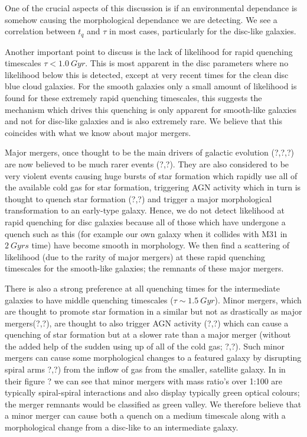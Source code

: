 \documentclass{mn2e}
\begin{document}
One of the crucial aspects of this discussion is if an environmental dependance is somehow causing the morphological dependance we are detecting. We see a correlation between $t_q$ and $\tau$ in most cases, particularly for the disc-like galaxies. 

Another important point to discuss is the lack of likelihood for rapid quenching timescales $\tau < 1.0~Gyr$. This is most apparent in the disc parameters where no likelihood below this is detected, except at very recent times for the clean disc blue cloud galaxies. For the smooth galaxies only a small amount of likelihood is found for these extremely rapid quenching timescales, this suggests the mechanism which drives this quenching is only apparent for smooth-like galaxies and not for disc-like galaxies and is also extremely rare. We believe that this coincides with what we know about major mergers. 

Major mergers, once thought to be the main drivers of galactic evolution (?,?,?) are now believed to be much rarer events (?,?). They are also considered to be very violent events causing huge bursts of star formation which rapidly use all of the available cold gas for star formation, triggering AGN activity which in turn is thought to quench star formation (?,?) and trigger a major morphological transformation to an early-type galaxy. Hence, we do not detect likelihood at rapid quenching for disc galaxies because all of those which have undergone a quench such as this (for example our own galaxy when it collides with M31 in $2~Gyrs$ time) have become smooth in morphology. We then find a scattering of likelihood (due to the rarity of major mergers) at these rapid quenching timescales for the smooth-like galaxies; the remnants of these major mergers. 

There is also a strong preference at all quenching times for the intermediate galaxies to have middle quenching timescales ($\tau \sim 1.5~Gyr$). Minor mergers, which are thought to promote star formation in a similar but not as drastically as major mergers(?,?), are thought to also trigger AGN activity (?,?) which can cause a quenching of star formation but at a slower rate than a major merger (without the added help of the sudden using up of all of the cold gas; ?,?). Such minor mergers can cause some morphological changes to a featured galaxy by disrupting spiral arms ?,?) from the inflow of gas from the smaller, satellite galaxy. In \citet{Darg} in their figure ? we can see that minor mergers with mass ratio's over 1:100 are typically spiral-spiral interactions and also display typically green optical colours; the merger remnants would be classified as green valley. We therefore believe that a minor merger can cause both a quench on a medium timescale along with a morphological change from a disc-like to an intermediate galaxy.
\end{document}
